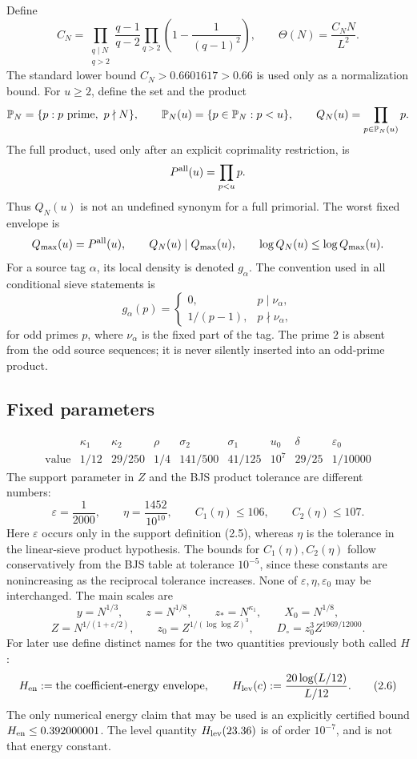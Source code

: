 \documentclass[11pt]{article}
\theoremstyle{definition}
\newcommand{\eps}{\varepsilon}
\begin{document}
Define
\[
 C_N=
 \prod_{\substack{q\mid N\\q>2}}\frac{q-1}{q-2}
 \prod_{q>2}\left(1-\frac1{(q-1)^2}\right),
 \qquad
 \Theta(N)=\frac{C_NN}{L^2}.
\]
The standard lower bound \(C_N>0.6601617>0.66\) is used only as a
normalization bound.  For \(u\ge2\), define the set and the product
\[
 \mathbb P_N=\{p:p\ {\rm prime},\ p\nmid N\},\qquad
 \mathbb P_N(u)=\{p\in\mathbb P_N:p<u\},\qquad
 Q_N(u)=\prod_{p\in\mathbb P_N(u)}p.
\]
The full product, used only after an explicit coprimality restriction, is
\[
 P^{\rm all}(u)=\prod_{p<u}p.
\]
Thus \(Q_N(u)\) is not an undefined synonym for a full primorial.  The
worst fixed envelope is
\[
 Q_{\max}(u)=P^{\rm all}(u),\qquad Q_N(u)\mid Q_{\max}(u),
 \qquad \log Q_N(u)\leq\log Q_{\max}(u).
\]
For a source tag \(\alpha\), its local density is denoted \(g_\alpha\).
The convention used in all conditional sieve statements is
\[
 g_\alpha(p)=
 \begin{cases}
 0,&p\mid \nu_\alpha,\\[2pt]
 1/(p-1),&p\nmid \nu_\alpha,
 \end{cases}
\tag{2.1}
\]
for odd primes \(p\), where \(\nu_\alpha\) is the fixed part of the tag.
The prime \(2\) is absent from the odd source sequences; it is never silently
inserted into an odd-prime product.

\subsection{Fixed parameters}
\label{sec:parameters}

\[
\begin{array}{c|cccccccc}
 &\kappa_1&\kappa_2&\rho&\sigma_2&\sigma_1&u_0&\delta&\eps_0\\
\hline
\text{value}&1/12&29/250&1/4&141/500&41/125&10^7&29/25&1/10000
\end{array}
\tag{2.2}
\]
The support parameter in \(Z\) and the BJS product tolerance are different
numbers:
\[
 \eps=\frac1{2000},\qquad
 \eta=\frac{1452}{10^{10}},\qquad
 C_1(\eta)\le106,\qquad C_2(\eta)\le107.
\tag{2.3}
\]
Here \(\eps\) occurs only in the support definition (2.5), whereas
\(\eta\) is the tolerance in the linear-sieve product hypothesis.  The
bounds for \(C_1(\eta),C_2(\eta)\) follow conservatively from the BJS table
at tolerance \(10^{-5}\), since these constants are nonincreasing as the
reciprocal tolerance increases.  None of \(\eps,\eta,\eps_0\) may be
interchanged.
The main scales are
\[
 y=N^{1/3},\qquad z=N^{1/8},\qquad z_*=N^{\kappa_1},
\qquad X_0=N^{1/8},
\tag{2.4}
\]
\[
 Z=N^{1/(1+\eps/2)},\qquad
 z_0=Z^{1/(\log\log Z)^3},\qquad
 D_\circ=z_0^3Z^{1969/12000}.
\tag{2.5}
\]
For later use define distinct names for the two quantities previously both
called \(H\):
\[
 H_{\rm en}:=\text{the coefficient-energy envelope},\qquad
 H_{\rm lev}(c):=\frac{20\log(L/12)}{L/12}.
\tag{2.6}
\]
The only numerical energy claim that may be used is an explicitly certified
bound \(H_{\rm en}\le0.392000001\).  The level quantity
\(H_{\rm lev}(23.36)\) is of order \(10^{-7}\), and is not that energy
constant.
\end{document}
